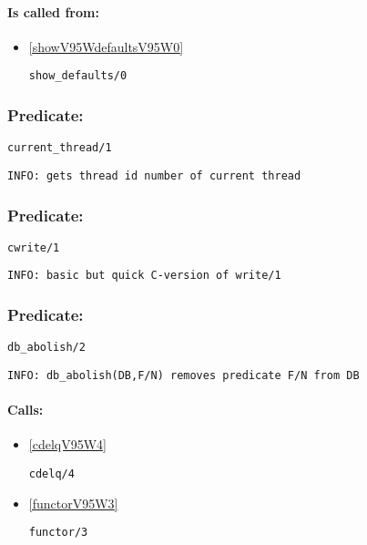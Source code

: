 \paragraph{Is called from:} 
\begin{itemize}
\item \ref{showV95WdefaultsV95W0} 
\begin{verbatim}
show_defaults/0
\end{verbatim}

\end{itemize}

\subsubsection{Predicate:} \label{currentV95WthreadV95W1}

\begin{verbatim}
current_thread/1
\end{verbatim}

{\small \begin{verbatim}
INFO: gets thread id number of current thread

\end{verbatim}}

\subsubsection{Predicate:} \label{cwriteV95W1}

\begin{verbatim}
cwrite/1
\end{verbatim}

{\small \begin{verbatim}
INFO: basic but quick C-version of write/1

\end{verbatim}}

\subsubsection{Predicate:} \label{dbV95WabolishV95W2}

\begin{verbatim}
db_abolish/2
\end{verbatim}

{\small \begin{verbatim}
INFO: db_abolish(DB,F/N) removes predicate F/N from DB

\end{verbatim}}
\paragraph{Calls:} 
\begin{itemize}
\item \ref{cdelqV95W4} 
\begin{verbatim}
cdelq/4
\end{verbatim}

\item \ref{functorV95W3} 
\begin{verbatim}
functor/3
\end{verbatim}

\end{itemize}
